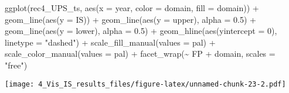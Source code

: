 \documentclass[
]{article}
\newenvironment{Shaded}{\begin{snugshade}}{\end{snugshade}}
\newcommand{\AttributeTok}[1]{\textcolor[rgb]{0.77,0.63,0.00}{#1}}
\newcommand{\DecValTok}[1]{\textcolor[rgb]{0.00,0.00,0.81}{#1}}
\newcommand{\FloatTok}[1]{\textcolor[rgb]{0.00,0.00,0.81}{#1}}
\newcommand{\FunctionTok}[1]{\textcolor[rgb]{0.00,0.00,0.00}{#1}}
\newcommand{\NormalTok}[1]{#1}
\newcommand{\SpecialCharTok}[1]{\textcolor[rgb]{0.00,0.00,0.00}{#1}}
\newcommand{\StringTok}[1]{\textcolor[rgb]{0.31,0.60,0.02}{#1}}
\begin{document}
\begin{Shaded}
\begin{Highlighting}[]
\FunctionTok{ggplot}\NormalTok{(rec4\_UPS\_ts, }\FunctionTok{aes}\NormalTok{(}\AttributeTok{x =}\NormalTok{ year, }\AttributeTok{color =}\NormalTok{ domain, }\AttributeTok{fill =}\NormalTok{ domain)) }\SpecialCharTok{+}
  \FunctionTok{geom\_line}\NormalTok{(}\FunctionTok{aes}\NormalTok{(}\AttributeTok{y =}\NormalTok{ IS)) }\SpecialCharTok{+}
  \FunctionTok{geom\_line}\NormalTok{(}\FunctionTok{aes}\NormalTok{(}\AttributeTok{y =}\NormalTok{ upper), }\AttributeTok{alpha =} \FloatTok{0.5}\NormalTok{) }\SpecialCharTok{+}
  \FunctionTok{geom\_line}\NormalTok{(}\FunctionTok{aes}\NormalTok{(}\AttributeTok{y =}\NormalTok{ lower), }\AttributeTok{alpha =} \FloatTok{0.5}\NormalTok{) }\SpecialCharTok{+}
  \FunctionTok{geom\_hline}\NormalTok{(}\FunctionTok{aes}\NormalTok{(}\AttributeTok{yintercept =} \DecValTok{0}\NormalTok{),}
             \AttributeTok{linetype =} \StringTok{"dashed"}\NormalTok{) }\SpecialCharTok{+}
    \FunctionTok{scale\_fill\_manual}\NormalTok{(}\AttributeTok{values =}\NormalTok{ pal) }\SpecialCharTok{+}
  \FunctionTok{scale\_color\_manual}\NormalTok{(}\AttributeTok{values =}\NormalTok{ pal) }\SpecialCharTok{+}
     \FunctionTok{facet\_wrap}\NormalTok{(}\SpecialCharTok{\textasciitilde{}}\NormalTok{ FP }\SpecialCharTok{+}\NormalTok{ domain, }\AttributeTok{scales =} \StringTok{"free"}\NormalTok{)}
\end{Highlighting}
\end{Shaded}

\texttt{[image: 4\_Vis\_IS\_results\_files/figure-latex/unnamed-chunk-23-2.pdf]}
\end{document}

